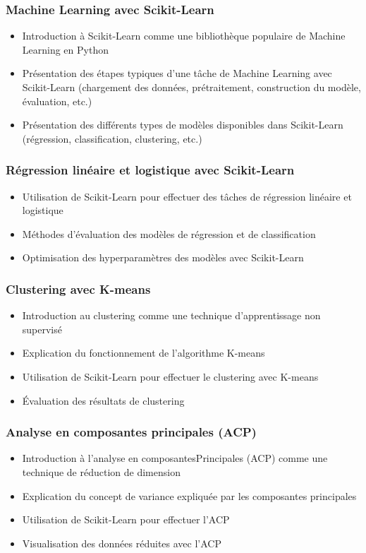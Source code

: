 \documentclass{beamer}
\begin{document}
\begin{frame}
	\frametitle{Machine Learning avec Scikit-Learn}
	\begin{itemize}
		\item Introduction à Scikit-Learn comme une bibliothèque populaire de Machine Learning en Python
		\item Présentation des étapes typiques d'une tâche de Machine Learning avec Scikit-Learn (chargement des données, prétraitement, construction du modèle, évaluation, etc.)
		\item Présentation des différents types de modèles disponibles dans Scikit-Learn (régression, classification, clustering, etc.)
	\end{itemize}
\end{frame}

\begin{frame}
	\frametitle{Régression linéaire et logistique avec Scikit-Learn}
	\begin{itemize}
		\item Utilisation de Scikit-Learn pour effectuer des tâches de régression linéaire et logistique
		\item Méthodes d'évaluation des modèles de régression et de classification
		\item Optimisation des hyperparamètres des modèles avec Scikit-Learn
	\end{itemize}
\end{frame}

\begin{frame}
	\frametitle{Clustering avec K-means}
	\begin{itemize}
		\item Introduction au clustering comme une technique d'apprentissage non supervisé
		\item Explication du fonctionnement de l'algorithme K-means
		\item Utilisation de Scikit-Learn pour effectuer le clustering avec K-means
		\item Évaluation des résultats de clustering
	\end{itemize}
\end{frame}

\begin{frame}
	\frametitle{Analyse en composantes principales (ACP)}
	\begin{itemize}
		\item Introduction à l'analyse en composantesPrincipales (ACP) comme une technique de réduction de dimension
		\item Explication du concept de variance expliquée par les composantes principales
		\item Utilisation de Scikit-Learn pour effectuer l'ACP
		\item Visualisation des données réduites avec l'ACP
	\end{itemize}
\end{frame}
\end{document}
